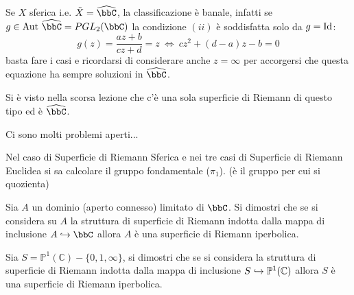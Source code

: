 Se $X$ sferica i.e. $\tilde {X}=\hat{\bbC}$, la classificazione è banale, infatti se $g\in\Aut{\hat{\bbC}}=PGL_2(\bbC)$ la condizione $(ii)$ è soddisfatta solo da $g=\text{Id}$:
$$
g(z)=\frac{az+b}{cz+d}=z\ \Leftrightarrow\ cz^2+(d-a)z-b=0
$$
basta fare i casi e ricordarsi di considerare anche $z=\infty$ per accorgersi che questa equazione ha sempre soluzioni in $\hat{\bbC}$.


 Si è visto nella scorsa lezione che c'è una sola superficie di Riemann di questo tipo ed è $\hat{\bbC}$.

 Ci sono molti problemi aperti...


\begin{osservazione}
Nel caso di Superficie di Riemann Sferica e nei tre casi di Superficie di Riemann Euclidea si sa calcolare il gruppo fondamentale ($\pi_1$). (è il gruppo per cui si quozienta)
\end{osservazione}

\begin{esercizio}
Sia $A$ un dominio (aperto connesso) limitato di $\bbC$. Si dimostri che se si considera su $A$ la struttura di superficie di Riemann indotta dalla mappa di inclusione $A\hrar\bbC$ allora $A$ è una superficie di Riemann iperbolica.
\end{esercizio}



\begin{esercizio}Sia $S=\mathbb{P}^1(\mathbb{C})\minus\{0,1,\infty\}$, si dimostri che se si considera la struttura di superficie di Riemann indotta dalla mappa di inclusione $S\hookrightarrow\mathbb{P}^1(\mathbb{C})$ allora $S$ è una superficie di Riemann iperbolica.
\end{esercizio}


